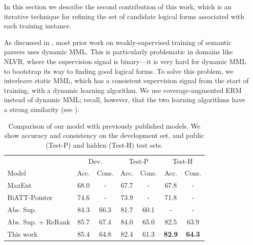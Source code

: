 In this section we describe the second contribution of this work, which is an iterative technique for refining the set of candidate logical forms associated with each training instance.

As discussed in , most prior work on weakly-supervised training of semantic parsers uses dynamic MML.  This is particularly problematic in domains like NLVR, where the supervision signal is binary---it is very hard for dynamic MML to bootstrap its way to finding good logical forms.  To solve this problem, we interleave static MML, which has a consistent supervision signal from the start of training, with a dynamic learning algorithm.  We use coverage-augmented ERM instead of dynamic MML; recall, however, that the two learning algorithms have a strong similarity (see ).

\begin{table}
	\centering
	\begin{tabular}{lcccccc}
	\toprule
	\multicolumn{1}{c}{} & \multicolumn{2}{c}{Dev.} & \multicolumn{2}{c}{Test-P} & \multicolumn{2}{c}{Test-H} \\
	Model & Acc. & Cons. & Acc. & Cons. & Acc. & Cons.\\
	\midrule
	MaxEnt \citep{suhr2017corpus} & 68.0 & - & 67.7 & - & 67.8 & - \\
	BiATT-Pointer \citep{tan2018object} & 74.6 & - & 73.9 & - & 71.8 & - \\
	Abs. Sup. \citep{goldman2017weakly} & 84.3 & 66.3 & 81.7 & 60.1 & - & - \\
	Abs. Sup. + ReRank \citep{goldman2017weakly} & 85.7 & 67.4 & 84.0 & 65.0 & 82.5 & 63.9 \\
	This work & 85.4 & 64.8 & 82.4 & 61.3 & \textbf{82.9} & \textbf{64.3} \\
	\bottomrule
	\end{tabular}
	\caption{Comparison of our model with previously published models. We show accuracy and consistency on the development set, and public (Test-P) and hidden (Test-H) test sets.}\label{tab:main_result}
\end{table}

